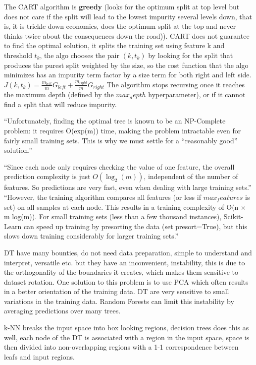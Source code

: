 \documentclass[12pt]{report}
\begin{document}
The CART algorithm is \textbf{greedy} (looks for the optimum split at top level but does not care if the split will lead to the lowest impurity several levels down, that is, it is trickle down economics, does the optimum split at the top and never thinks twice about the consequences down the road)). CART does not guarantee to find the optimal solution, it splits the training set using feature k and threshold $t_k$, the algo chooses the pair $(k,t_k)$ by looking for the split that produces the purest split weighted by the size, so the cost function that the algo minimizes has an impurity term factor by a size term for both right and left side.
$J(k,t_k) = \frac{m_{left}}{m}G_{left} + \frac{m_{right}}{m}G_{right}$
The algorithm stops recursing once it reaches the maximum depth (defined by the $max_depth$ hyperparameter), or if it cannot find a split that will reduce impurity.

“Unfortunately, finding the optimal tree is known to be an NP-Complete problem: it requires O(exp(m)) time, making the problem intractable even for fairly small training sets. This is why we must settle for a “reasonably good” solution.”

“Since each node only requires checking the value of one feature, the overall prediction complexity is just $O(\log_{2}(m))$, independent of the number of features. So predictions are very fast, even when dealing with large training sets.”
“However, the training algorithm compares all features (or less if $max_features$ is set) on all samples at each node. This results in a training complexity of O(n × m log(m)). For small training sets (less than a few thousand instances), Scikit-Learn can speed up training by presorting the data (set presort=True), but this slows down training considerably for larger training sets.”
 

DT have many bounties, do not need data preparation, simple to understand and interpret, versatile etc. but they have an inconvenient, instability, this is due to the orthogonality of the boundaries it creates, which makes them sensitive to dataset rotation.  One solution to this problem is to use PCA which often results in a better orientation of the training data. DT are very sensitive to small variations in the training data. Random Forests can limit this instability by averaging predictions over many trees.

k-NN breaks the input space into box looking regions, decision trees does this as well, each node of the DT is associated with a region in the input space, space is then divided into non-overlapping regions with a 1-1 correspondence between leafs and input regions.
\end{document}
